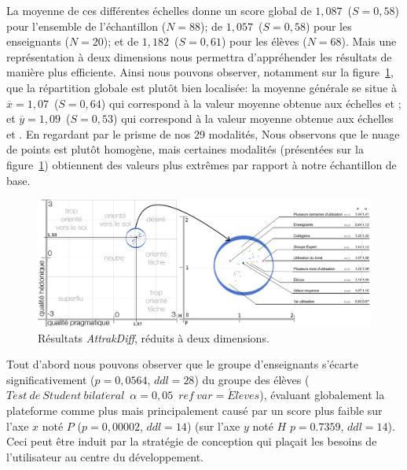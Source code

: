         La moyenne de ces différentes échelles donne un score global de $1,087$~($S=0,58$) pour l'ensemble de l'échantillon ($N=88$); de $1,057$~($S=0,58$) pour les enseignants ($N=20$); et de $1,182$~($S=0,61$) pour les élèves ($N=68$).
        Mais une représentation à deux dimensions nous permettra d'appréhender les résultats de manière plus efficiente.
        Ainsi nous pouvons observer, notamment sur la figure~\ref{fig:attrakdiff_point}, que la répartition globale est plutôt bien localisée:
        la moyenne générale se situe à $\overline{x}=1,07$~($S=0,64$) qui correspond à la valeur moyenne obtenue aux échelles  et ; et $\overline{y}=1,09$~($S=0,53$) qui correspond à la valeur moyenne obtenue aux échelles  et .
        En regardant par le prisme de nos 29 modalités, Nous observons que le nuage de points est plutôt homogène, mais certaines modalités (présentées sur la figure~\ref{fig:attrakdiff_point}) obtiennent des valeurs plus extrêmes par rapport à notre échantillon de base.
        \begin{figure}[!h]
            \centering
            \includegraphics[width=0.9\linewidth]{Figures/Desprez_didapro-attrakdiff_point.png}
            \caption{Résultats \textit{AttrakDiff}, réduits à deux dimensions.}\label{fig:attrakdiff_point}
        \end{figure}\par%
        Tout d'abord nous pouvons observer que le groupe d'enseignants s'écarte significativement ($p=0,0564$, $ddl=28$) du groupe des élèves  ($Test\ de\ Student\ bilat\acute{e}ral\;\ \alpha=0,05\;\ ref\ var=\acute{E}l\grave{e}ves$), évaluant globalement la plateforme comme plus  mais principalement causé par un score plus faible sur l'axe $x$ noté $P$  ($p=0,00002$, $ddl=14$) (sur l'axe $y$ noté $H$  $p=0.7359$, $ddl=14$).
        Ceci peut être induit par la stratégie de conception qui plaçait les besoins  de l'utilisateur au centre du développement.

